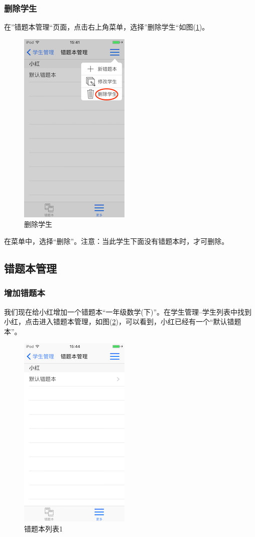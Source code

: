 \subsubsection{删除学生}
\label{delete_student}
在”错题本管理“页面，点击右上角菜单，选择”删除学生“如图(\ref{img14})。
\begin{figure}[H]
	\centering
	\includegraphics{img/14.png}
	\caption{删除学生}
	\label{img14}
\end{figure}

在菜单中，选择“删除”。注意：当此学生下面没有错题本时，才可删除。

\subsection{错题本管理}
\subsubsection{增加错题本}
我们现在给小红增加一个错题本“一年级数学(下)”。在学生管理--学生列表中找到小红，点击进入错题本管理，如图(\ref{img15})，可以看到，小红已经有一个“默认错题本”。
\begin{figure}[H]
	\centering
	\includegraphics{img/15.png}
	\caption{错题本列表1}
	\label{img15}
\end{figure}

